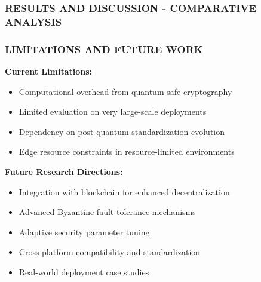\documentclass[aspectratio=169]{beamer}
\begin{document}
\begin{frame}
    \frametitle{RESULTS AND DISCUSSION - COMPARATIVE ANALYSIS}
    \begin{center}
    \end{center}
\end{frame}

\begin{frame}
    \frametitle{LIMITATIONS AND FUTURE WORK}
    \textbf{Current Limitations:}
    \begin{itemize}
        \item Computational overhead from quantum-safe cryptography
        \item Limited evaluation on very large-scale deployments
        \item Dependency on post-quantum standardization evolution
        \item Edge resource constraints in resource-limited environments
    \end{itemize}
    
    \textbf{Future Research Directions:}
    \begin{itemize}
        \item Integration with blockchain for enhanced decentralization
        \item Advanced Byzantine fault tolerance mechanisms
        \item Adaptive security parameter tuning
        \item Cross-platform compatibility and standardization
        \item Real-world deployment case studies
    \end{itemize}
\end{frame}
\end{document}
